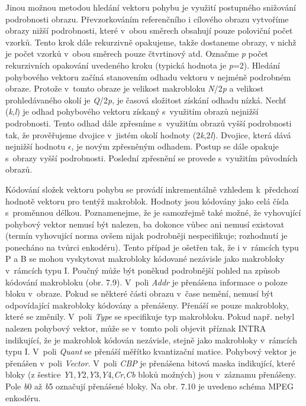 \noindent 

\noindent Jinou možnou metodou hledání vektoru pohybu je využití postupného snižování podrobnosti obrazu. Převzorkováním referenčního i cílového obrazu vytvoříme obrazy nižší podrobnosti, které v~obou směrech obsahují pouze poloviční počet vzorků. Tento krok dále rekurzivně opakujeme, takže dostaneme obrazy, v nichž je počet vzorků v~obou směrech pouze čtvrtinový atd. Označme \textit{p} počet rekurzivních opakování uvedeného kroku (typická hodnota je \textit{p}=2). Hledání pohybového vektoru začíná stanovením odhadu vektoru v nejméně podrobném obraze. Protože v~tomto obraze je velikost makrobloku \textit{N}/2\textit{p} a velikost prohledávaného okolí je \textit{Q}/2\textit{p}, je časová složitost získání odhadu nízká. Nechť (\textit{k},\textit{l}) je odhad pohybového vektoru získaný s~využitím obrazů nejnižší podrobnosti. Tento odhad dále zpřesníme s~využitím obrazů vyšší podrobnosti tak, že prověřujeme dvojice v~jistém okolí hodnoty (2\textit{k},2\textit{l}). Dvojice, která dává nejnižší hodnotu $\epsilon$, je novým zpřesněným odhadem. Postup se dále opakuje s~obrazy vyšší podrobnosti. Poslední zpřesnění se provede s~využitím původních obrazů.

\noindent 

\noindent Kódování složek vektoru pohybu se provádí inkrementálně vzhledem k~předchozí hodnotě vektoru pro tentýž makroblok. Hodnoty jsou kódovány jako celá čísla s~proměnnou délkou. Poznamenejme, že je samozřejmě také možné, že vyhovující pohybový vektor nemusí být nalezen, ba dokonce vůbec ani nemusí existovat (termín vyhovující norma ovšem nijak podrobněji nespecifikuje; rozhodnutí je ponecháno na tvůrci enkodéru). Tento případ je ošetřen tak, že i v~rámcích typu P a B se mohou vyskytovat makrobloky kódované nezávisle jako makrobloky v~rámcích typu I. Poučný může být poněkud podrobnější pohled na způsob kódování makrobloku (obr. 7.9). V~poli \textit{Addr} je přenášena informace o poloze bloku v~obraze. Pokud se některé části obrazu v~čase nemění, nemusí být odpovídající makrobloky kódovány a přenášeny. Přenáší se pouze makrobloky, které se změnily. V~poli \textit{Type} se specifikuje typ makrobloku. Pokud např. nebyl nalezen pohybový vektor, může se v~tomto poli objevit příznak INTRA indikující, že je makroblok kódován nezávisle, stejně jako makrobloky v~rámcích typu I. V~poli \textit{Quant} se přenáší měřítko kvantizační matice. Pohybový vektor je přenášen v~poli \textit{Vector}. V~poli \textit{CBP} je přenášena bitová maska indikující, které bloky (z šestice \textit{Y}1,\textit{Y}2,\textit{Y}3,\textit{Y}4,\textit{Cr},\textit{Cb} bloků možných) jsou v~záznamu přenášeny. Pole \textit{b}0 až \textit{b}5 označují přenášené bloky. Na obr. 7.10 je uvedeno schéma MPEG enkodéru.

